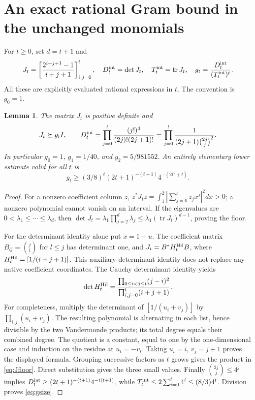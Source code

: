 \documentclass[11pt]{article}
\newtheorem{lemma}[theorem]{Lemma}
\newcommand{\tr}{\operatorname{tr}}
\begin{document}
\section{An exact rational Gram bound in the unchanged monomials}

For $t\ge0$, set $d=t+1$ and
\begin{equation}\label{eq:J}
 J_t=\left[\frac{2^{i+j+1}-1}{i+j+1}\right]_{i,j=0}^t,
 \quad D_t^{\rm int}=\det J_t,
 \quad T_t^{\rm int}=\tr J_t,
 \quad g_t=\frac{D_t^{\rm int}}{(T_t^{\rm int})^t}.
\end{equation}
All these are explicitly evaluated rational expressions in $t$.
The convention is $g_0=1$.

\begin{lemma}\label{lem:J}
The matrix $J_t$ is positive definite and
\begin{equation}\label{eq:Jfloor}
 J_t\succeq g_tI,\qquad
 D_t^{\rm int}=\prod_{j=0}^t
 \frac{(j!)^4}{(2j)!(2j+1)!}
 =\prod_{j=0}^t\frac1{(2j+1)\binom{2j}j^2}.
\end{equation}
In particular $g_0=1$, $g_1=1/40$, and $g_2=5/981552$.
An entirely elementary lower estimate valid for all $t$ is
\begin{equation}\label{eq:gsize}
 g_t\ge(3/8)^t(2t+1)^{-(t+1)}4^{-(2t^2+t)}.
\end{equation}
\end{lemma}
\begin{proof}
For a nonzero coefficient column $z$,
$z^*J_tz=\int_1^2|\sum_{j=0}^tz_jx^j|^2dx>0$;
a nonzero polynomial cannot vanish on an interval. If the eigenvalues
are $0<\lambda_1\le\cdots\le\lambda_d$, then
$\det J_t=\lambda_1\prod_{j=2}^d\lambda_j
\le\lambda_1(\tr J_t)^{d-1}$, proving the floor.

For the determinant identity alone put $x=1+u$. The coefficient
matrix $B_{lj}=\binom jl$ for $l\le j$ has determinant one, and
$J_t=B^*H_t^{\rm Hil}B$, where
$H_t^{\rm Hil}=[1/(i+j+1)]$. This auxiliary determinant identity
does not replace any native coefficient coordinates. The Cauchy
determinant identity yields
\[
 \det H_t^{\rm Hil}
 =\frac{\prod_{0\le i<j\le t}(j-i)^2}
 {\prod_{i,j=0}^t(i+j+1)}.
\]
For completeness, multiply the determinant of $[1/(u_i+v_j)]$
by $\prod_{i,j}(u_i+v_j)$. The resulting polynomial is alternating
in each list, hence divisible by the two Vandermonde products;
its total degree equals their combined degree. The quotient is a
constant, equal to one by the one-dimensional case and induction
on the residue at $u_t=-v_t$. Taking $u_i=i$, $v_j=j+1$ proves
the displayed formula. Grouping successive factors as $t$ grows
gives the product in \eqref{eq:Jfloor}. Direct substitution gives
the three small values. Finally $\binom{2j}j\le4^j$ implies
$D_t^{\rm int}\ge(2t+1)^{-(t+1)}4^{-t(t+1)}$, while
$T_t^{\rm int}\le2\sum_{i=0}^t4^i\le(8/3)4^t$.
Division proves \eqref{eq:gsize}.
\end{proof}
\end{document}
